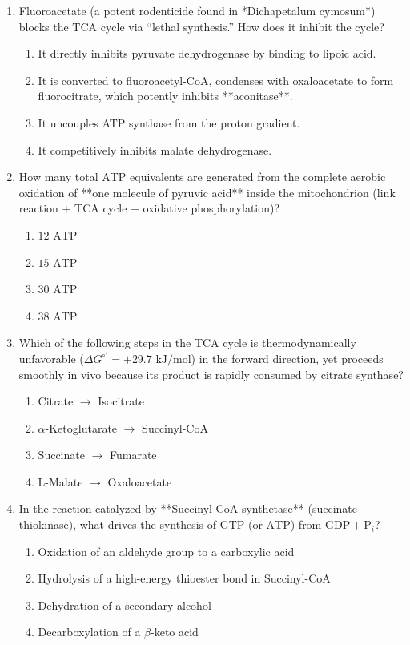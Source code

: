 \documentclass[11pt, a4paper]{article}
\begin{document}
\begin{enumerate}[label=\textbf{\arabic*.}]
\item Fluoroacetate (a potent rodenticide found in *Dichapetalum cymosum*) blocks the TCA cycle via ``lethal synthesis.'' How does it inhibit the cycle?
\begin{enumerate}[label=(\Alph*)]
    \item It directly inhibits pyruvate dehydrogenase by binding to lipoic acid.
    \item It is converted to fluoroacetyl-CoA, condenses with oxaloacetate to form fluorocitrate, which potently inhibits **aconitase**.
    \item It uncouples ATP synthase from the proton gradient.
    \item It competitively inhibits malate dehydrogenase.
\end{enumerate}

\item How many total $\text{ATP}$ equivalents are generated from the complete aerobic oxidation of **one molecule of pyruvic acid** inside the mitochondrion (link reaction + TCA cycle + oxidative phosphorylation)?
\begin{enumerate}[label=(\Alph*)]
    \item $12\text{ ATP}$
    \item $15\text{ ATP}$
    \item $30\text{ ATP}$
    \item $38\text{ ATP}$
\end{enumerate}

\item Which of the following steps in the TCA cycle is thermodynamically unfavorable ($\Delta G^{\circ\prime} = +29.7\text{ kJ/mol}$) in the forward direction, yet proceeds smoothly in vivo because its product is rapidly consumed by citrate synthase?
\begin{enumerate}[label=(\Alph*)]
    \item Citrate $\rightarrow$ Isocitrate
    \item $\alpha$-Ketoglutarate $\rightarrow$ Succinyl-CoA
    \item Succinate $\rightarrow$ Fumarate
    \item L-Malate $\rightarrow$ Oxaloacetate
\end{enumerate}

\item In the reaction catalyzed by **Succinyl-CoA synthetase** (succinate thiokinase), what drives the synthesis of $\text{GTP}$ (or $\text{ATP}$) from $\text{GDP} + \text{P}_i$?
\begin{enumerate}[label=(\Alph*)]
    \item Oxidation of an aldehyde group to a carboxylic acid
    \item Hydrolysis of a high-energy thioester bond in Succinyl-CoA
    \item Dehydration of a secondary alcohol
    \item Decarboxylation of a $\beta$-keto acid
\end{enumerate}


\end{enumerate}
\end{document}
